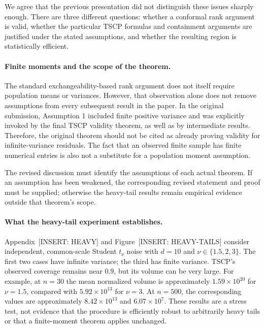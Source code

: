 \documentclass[11pt]{article}
\numberwithin{equation}{section}
\newcommand{\pending}[1]{\textcolor{AuthorRed}{[INSERT: #1]}}
\newcommand{\AppHeavy}{Appendix~\pending{HEAVY}} %
\newcommand{\FigHeavy}{Figure~\pending{HEAVY-TAILS}} %
\begin{document}
We agree that the previous presentation did not distinguish these issues
sharply enough. There are three different questions: whether a conformal
rank argument is valid, whether the particular TSCP formulas and
containment arguments are justified under the stated assumptions, and
whether the resulting region is statistically efficient.

\paragraph{Finite moments and the scope of the theorem.}
The standard exchangeability-based rank argument does not itself require
population means or variances. However, that observation alone does not
remove assumptions from every subsequent result in the paper. In the
original submission, Assumption 1 included finite positive variance and
was explicitly invoked by the final TSCP validity theorem, as well as
by intermediate results. Therefore, the original theorem should not be
cited as already proving validity for infinite-variance residuals.
The fact that an observed finite sample has finite numerical entries
is also not a substitute for a population moment assumption.

The revised discussion must identify the assumptions of each actual
theorem. If an assumption has been weakened, the corresponding revised
statement and proof must be supplied; otherwise the heavy-tail results
remain empirical evidence outside that theorem's scope.

\paragraph{What the heavy-tail experiment establishes.}
\AppHeavy{} and \FigHeavy{} consider independent, common-scale Student
$t_\nu$ noise with $d=10$ and $\nu\in\{1.5,2,3\}$. The first two cases
have infinite variance; the third has finite variance. TSCP's observed
coverage remains near $0.9$, but its volume can be very large. For
example, at $n=30$ the mean normalized volume is approximately
$1.59\times10^{20}$ for $\nu=1.5$, compared with $5.92\times10^{13}$
for $\nu=3$. At $n=500$, the corresponding values are approximately
$8.42\times10^{13}$ and $6.07\times10^7$. These results are a stress
test, not evidence that the procedure is efficiently robust to arbitrarily
heavy tails or that a finite-moment theorem applies unchanged.
\end{document}
